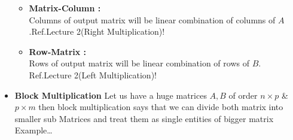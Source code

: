 \documentclass[a4paper,11pt]{article}
\numberwithin{equation}{section}
\begin{document}
\begin{itemize}
\begin{itemize}
            \item \textbf{Matrix-Column : }\\Columns of output matrix will be linear combination of columns of $A$.Ref.Lecture 2(Right Multiplication)!
            
            \item \textbf{Row-Matrix : }\\Rows of output matrix will be linear combination of rows of $B$.\hspace{2cm} Ref.Lecture 2(Left Multiplication)!
        \end{itemize}
    \item \textbf{Block Multiplication}
        Let us have a huge matrices $A,B$ of order $n \times p$ \& $p \times m$ then block multiplication says that we can divide both matrix into smaller sub Matrices and treat them as single entities of bigger matrix Example\dots
        

\end{itemize}
\end{document}
